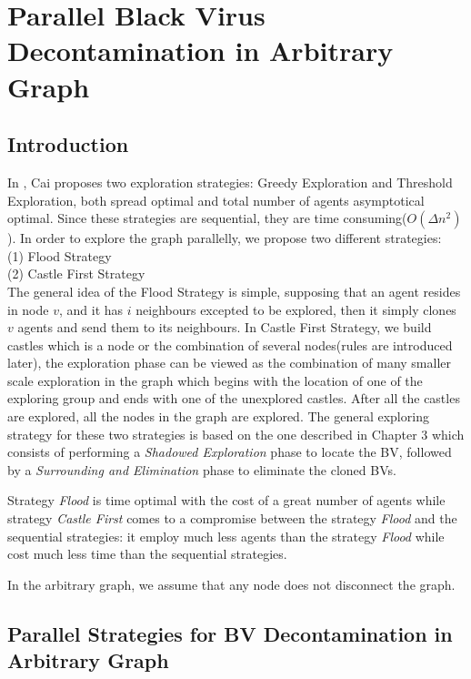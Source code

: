 \chapter {Parallel Black Virus Decontamination in Arbitrary Graph}
\label{TL}

\section{Introduction}
In \cite{Cai}, Cai proposes two exploration strategies: Greedy Exploration and Threshold Exploration, both spread optimal and total number of agents asymptotical optimal. Since these strategies are sequential, they are time consuming($O(\Delta n^2)$).  In order to explore the graph parallelly, we propose two different strategies: \\
(1) Flood Strategy\\
(2) Castle First Strategy\\
The general idea of the Flood Strategy is simple, supposing that an agent resides in node $v$, and it has $i$ neighbours excepted to be explored, then it simply clones $v$ agents and send them to its neighbours. In Castle First Strategy, we build castles which is a node or the combination of several nodes(rules are introduced later), the exploration phase can be viewed as the combination of many smaller scale exploration in the graph which begins with the location of one of the exploring group and ends with one of the unexplored castles. After all the castles are explored, all the nodes in the graph are explored. The general exploring strategy for these two strategies is based on the one described in Chapter 3 which consists of performing a {\em Shadowed Exploration} phase to locate the BV, followed by a {\em Surrounding and Elimination} phase to eliminate the cloned BVs. 

Strategy {\em Flood}  is time optimal with the cost of a great number of agents while strategy {\em Castle First} comes to a compromise between the strategy {\em Flood} and the sequential strategies: it employ much less agents than the strategy {\em Flood} while cost much less time than the sequential strategies. 

In the arbitrary graph, we assume that any node does not disconnect the graph.

\section{Parallel Strategies for BV Decontamination in Arbitrary Graph}
